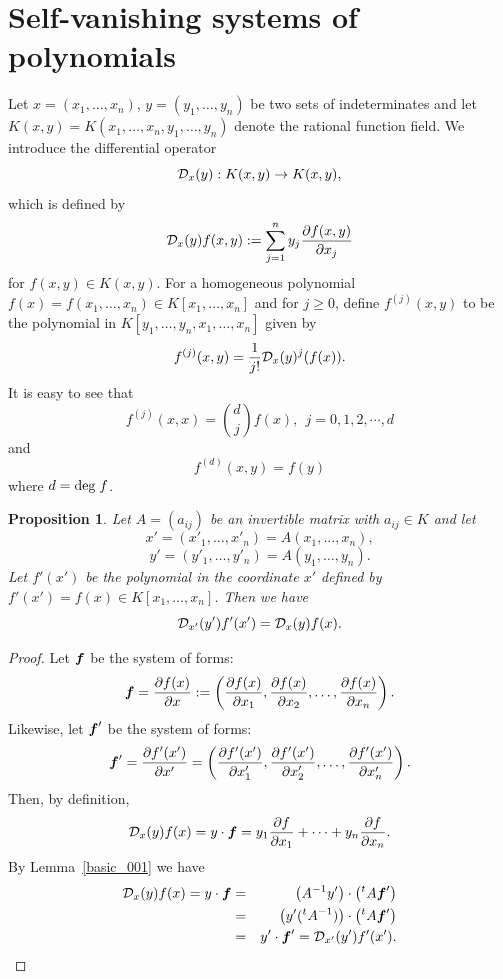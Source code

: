 \documentclass[12pt]{article}
\newtheorem{proposition}[theorem]{Proposition}
\theoremstyle{definition}
\newtheorem{notation}[theorem]{Notation}
\theoremstyle{remark}
\def\deg{{\rm deg}}
\def\cD{{\cal D}}
\def\boldf{\mbox{\boldmath $f$}}
\def\pa{\partial}
\begin{document}
\section{Self-vanishing systems of polynomials} \label{self-vanishing-system}
Let  $x=(x_1, \ldots, x_n)$, $y=(y_1, \ldots, y_n)$ be two sets of  indeterminates and let 
$K(x,y)=K(x_1, \ldots, x_n, \allowbreak y_1, \ldots, y_n)$ denote the rational function field. 
We introduce the differential operator 
\[\cD _x(y) : K(x,y) \rightarrow K(x,y),\]
which is defined by 
\[\cD _{x}(y)f(x,y):=\sum _{j=1}^n y_j\frac{\pa f(x,y)}{\pa x_j}\]
for $f(x,y) \in K(x,y)$.   
For a homogeneous polynomial  $f(x)=f(x_1, \ldots, x_n) \in K[x_1, \ldots, x_n]$ and 
for $j \geq 0$,  define $f^{(j)}(x,y)$ to be the 
polynomial in $K[y_1, \ldots, y_n, x_1, \ldots, x_n]$  given by 
\[f^{(j)}(x,y) = \frac{1}{j!}\cD_x(y)^j(f(x)).\] 
It is easy to see that 
\[f^{(j)}(x,x) = \binom{d}{j}f(x), \ \  j=0,1,2,\cdots, d\] 
and
\[f^{(d)}(x,y) =f(y)\] 
 where $d=\deg \;f$.  
 
\begin{proposition}   %
Let $A=(a_{ij})$ be an invertible matrix with $a_{ij} \in K$ and let 
\[x'=(x'_1, \ldots, x'_n)=A(x_1, \ldots, x_n),\]
\[y'=(y'_1, \ldots, y'_n)=A(y_1, \ldots, y_n).\]
Let $f'(x')$ be the polynomial in the coordinate $x'$ defined by 
$f'(x')= f(x) \in K[x_1, \ldots, x_n]$. 
Then we have 
\[\cD_{x'}(y')f'(x')=\cD_x(y)f(x).\]
\end{proposition}

\begin{proof}
Let $\boldf$ be the system of forms:  
\[ \boldf = \frac{\pa f(x)}{\pa x}: =\left(\frac{\pa f(x)}{\pa x_1},\frac{\pa f(x)}{\pa x_2},\ldots, \frac{\pa f(x)}{\pa x_n}     \right).  \]
Likewise, let $\boldf'$  be the system of forms: 
\[ \boldf' = \frac{\pa f'(x')}{\pa x'} =\left(\frac{\pa f'(x')}{\pa x'_1},\frac{\pa f'(x')}{\pa x'_2},\ldots, \frac{\pa f'(x')}{\pa x'_n}     \right).  \]
Then, by definition, 
\[ \cD_x(y)f(x)= y\cdot \boldf = y_1\frac{\pa f}{\pa x_1} + \cdots + y_n\frac{\pa f}{\pa x_n}.\]
By  Lemma~\ref{basic_001} we have 
\begin{eqnarray*}
\cD_x(y)f(x) = y \cdot \boldf   &  =  &  \left(A^{-1}y'\right)   \cdot   \left({}^tA  \boldf '\right)  \\
                                  &  =  &  \big( y' ({}^tA^{-1}) \big)   \cdot \big({}^t A \boldf '\big)  \\
                                  &  =  &    y' \cdot  \boldf '   = \cD_{x'}(y')f'(x'). 
\end{eqnarray*}
\end{proof}
\end{document}
